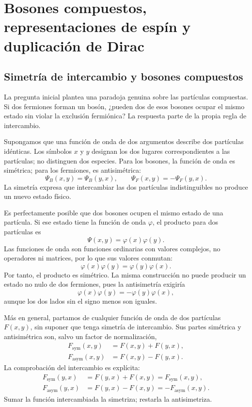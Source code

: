 \chapter{Bosones compuestos, representaciones de espín y duplicación de Dirac}

\section{Simetría de intercambio y bosones compuestos}

La pregunta inicial plantea una paradoja genuina sobre las partículas compuestas. Si dos fermiones forman un bosón, ¿pueden dos de esos bosones ocupar el mismo estado sin violar la exclusión fermiónica? La respuesta parte de la propia regla de intercambio.

Supongamos que una función de onda de dos argumentos describe dos partículas idénticas. Los símbolos \(x\) y \(y\) designan los dos lugares correspondientes a las partículas; no distinguen dos especies. Para los bosones, la función de onda es simétrica; para los fermiones, es antisimétrica:
\begin{equation}
\Psi_B(x,y)=\Psi_B(y,x),
\qquad
\Psi_F(x,y)=-\Psi_F(y,x).
\end{equation}
La simetría expresa que intercambiar las dos partículas indistinguibles no produce un nuevo estado físico.

Es perfectamente posible que dos bosones ocupen el mismo estado de una partícula. Si ese estado tiene la función de onda \(\varphi\), el producto para dos partículas es
\begin{equation}
\Psi(x,y)=\varphi(x)\varphi(y).
\end{equation}
Las funciones de onda son funciones ordinarias con valores complejos, no operadores ni matrices, por lo que sus valores conmutan:
\begin{equation}
\varphi(x)\varphi(y)=\varphi(y)\varphi(x).
\end{equation}
Por tanto, el producto es simétrico. La misma construcción no puede producir un estado no nulo de dos fermiones, pues la antisimetría exigiría
\begin{equation}
\varphi(x)\varphi(y)=-\varphi(y)\varphi(x),
\end{equation}
aunque los dos lados sin el signo menos son iguales.

Más en general, partamos de cualquier función de onda de dos partículas \(F(x,y)\), sin suponer que tenga simetría de intercambio. Sus partes simétrica y antisimétrica son, salvo un factor de normalización,
\begin{align}
F_{\mathrm{sym}}(x,y)&=F(x,y)+F(y,x),\\
F_{\mathrm{asym}}(x,y)&=F(x,y)-F(y,x).
\end{align}
La comprobación del intercambio es explícita:
\begin{align}
F_{\mathrm{sym}}(y,x)
&=F(y,x)+F(x,y)
=F_{\mathrm{sym}}(x,y),\\
F_{\mathrm{asym}}(y,x)
&=F(y,x)-F(x,y)
=-F_{\mathrm{asym}}(x,y).
\end{align}
Sumar la función intercambiada la simetriza; restarla la antisimetriza.

